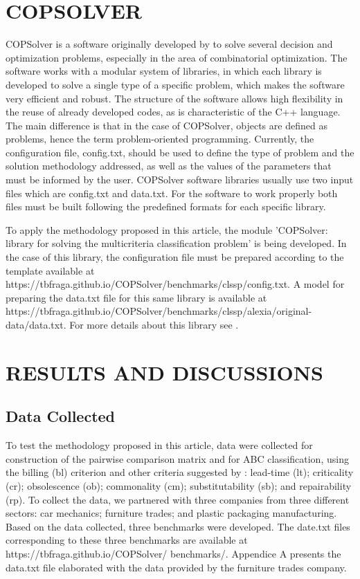 \documentclass[10pt,fleqn,a4paper,twoside]{article}
\begin{document}
	\section{COPSOLVER}
	
	COPSolver is a software originally developed by \cite{Fraga2023} to solve several decision and optimization problems, especially in the area of combinatorial optimization. The software works with a modular system of libraries, in which each library is developed to solve a single type of a specific problem, which makes the software very efficient and robust. The structure of the software allows high flexibility in the reuse of already developed codes, as is characteristic of the C++ language. The main difference is that in the case of COPSolver, objects are defined as problems, hence the term problem-oriented programming. Currently, the configuration file, config.txt, should be used to define the type of problem and the solution methodology addressed, as well as the values of the parameters that must be informed by the user. COPSolver software libraries usually use two input files which are config.txt and data.txt. For the software to work properly both files must be built following the predefined formats for each specific library.  
	
	To apply the methodology proposed in this article, the module 'COPSolver: library for solving the multicriteria classification problem' is being developed. In the case of this library, the configuration file must be prepared according to the template available at https://tbfraga.github.io/COPSolver/benchmarks/clssp/config.txt. A model for preparing the data.txt file for this same library is available at https://tbfraga.github.io/COPSolver/benchmarks/clssp/alexia/original-data/data.txt. For more details about this library see \cite{Fraga2024}.
	
	\section{RESULTS AND DISCUSSIONS}
    
    \subsection{Data Collected}
    
    To test the methodology proposed in this article, data were collected for construction of the pairwise comparison matrix and for ABC classification, using the billing (bl) criterion and other criteria suggested by \cite{FloresWhybark1986}: lead-time (lt); criticality (cr); obsolescence (ob); commonality (cm); substitutability (sb); and repairability (rp). To collect the data, we partnered with three companies from three different sectors: car mechanics; furniture trades; and plastic packaging manufacturing. Based on the data collected, three benchmarks were developed. The date.txt files corresponding to these three benchmarks are available at https://tbfraga.github.io/COPSolver/ benchmarks/. Appendice A presents the data.txt file elaborated with the data provided by the furniture trades company.
    
\end{document}
